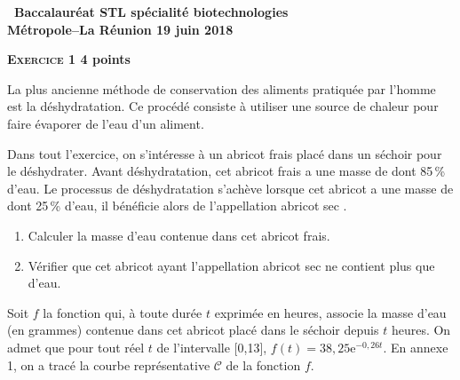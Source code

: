 \documentclass[10pt,a4paper,french]{article}
\begin{document}
\setlength\parindent{0mm}

\pagestyle{fancy}
\thispagestyle{empty}
\begin{center}{\Large \textbf{\decofourleft~Baccalauréat STL spécialité biotechnologies  ~\decofourright\\[5pt]Métropole--La Réunion 19 juin 2018}}
\end{center}

\vspace{0,25cm}
 
\textbf{\textsc{Exercice 1} \hfill 4 points}  

\vspace{0.25cm}


La plus ancienne méthode de conservation des aliments pratiquée par l'homme est la déshydratation.
Ce procédé consiste à utiliser une source de chaleur pour faire évaporer de l'eau d'un aliment.

Dans tout l'exercice, on s'intéresse à un abricot frais placé dans un séchoir pour le déshydrater.
Avant déshydratation, cet abricot frais a une masse de   dont 85\,\% d'eau. Le processus de
déshydratation s'achève lorsque cet abricot a une masse de  dont 25\,\% d'eau, il bénéficie alors de
l'appellation \og abricot sec \fg.
\begin{enumerate}
\item  Calculer la masse d'eau contenue dans cet abricot frais.
\item Vérifier que cet abricot ayant l'appellation \og abricot sec\fg{} ne contient plus que   d'eau.
\end{enumerate}

Soit $f$ la fonction qui, à toute durée $t$ exprimée en heures, associe la masse d'eau (en grammes)
contenue dans cet abricot placé dans le séchoir depuis $t$ heures. On admet que pour tout réel $t$ de
l'intervalle [0,13], $f(t) = 38,25\text{e}^{-0,26t}$. En annexe 1, on a tracé la courbe représentative $\mathcal{C}$ de la
fonction $f$.
\end{document}
